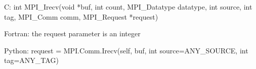 C:
int MPI_Irecv(void *buf,
  int count, MPI_Datatype datatype, int source, int tag,
  MPI_Comm comm, MPI_Request *request)

Fortran:
the request parameter is an integer
  
Python:
request = MPI.Comm.Irecv(self,
    buf, int source=ANY_SOURCE, int tag=ANY_TAG)
